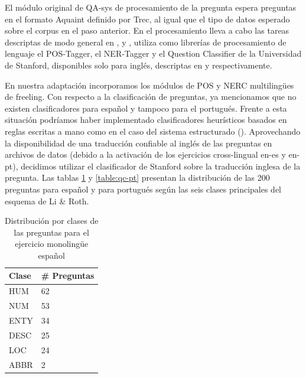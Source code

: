 El módulo original de QA-sys de procesamiento de la pregunta espera preguntas en el formato Aquaint definido por Trec, al igual que el tipo de datos esperado sobre el corpus en el paso anterior. En el procesamiento lleva a cabo las tareas descriptas de modo general en ,  y ,  utiliza como librerías de procesamiento de lenguaje el POS-Tagger, el NER-Tagger y el Question Classifier de la Universidad de Stanford, disponibles solo para inglés, descriptas en  y  respectivamente.

En nuestra adaptación incorporamos los módulos de POS y NERC multilingües de freeling. Con respecto a la clasificación de preguntas, ya mencionamos que no existen clasificadores para español y tampoco para el portugués. Frente a esta situación podríamos haber implementado clasificadores heurísticos basados en reglas escritas a mano como en el caso del sistema estructurado (). Aprovechando la disponibilidad de una traducción confiable al inglés de las preguntas en archivos de datos (debido a la activación de los ejercicios cross-lingual en-es y en-pt), decidimos utilizar el clasificador de Stanford sobre la traducción inglesa de la pregunta.
Las tablas \ref{table:qc-es} y \ref{table:qc-pt} presentan la distribución de las 200 preguntas para español y para portugués según las seis clases principales del esquema de Li \& Roth.

\begin{table}
\centering
\begin{center}
\begin{tabular}{| l | l | }
\hline
Clase & \# Preguntas  \\ \hline
HUM &  62\\ \hline
NUM &  53\\ \hline
ENTY &  34\\ \hline
DESC &  25\\ \hline
LOC &  24\\ \hline
ABBR &  2\\ \hline
\end{tabular}
\caption{Distribución por clases de las preguntas para el ejercicio monolingüe español}
\label{table:qc-es}
\end{center}
\end{table}



